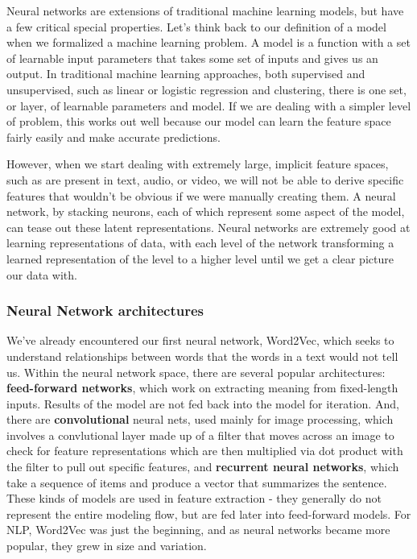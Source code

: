\documentclass[11pt, table]{diazessay} %
\begin{document}
\begin{sloppypar}
Neural networks are extensions of traditional machine learning models, but have a few critical special properties. Let's think back to our definition of a model when we formalized a machine learning problem. A model is a function with a set of learnable input parameters that takes some set of inputs and gives us an output. In traditional machine learning approaches, both supervised and unsupervised, such as linear or logistic regression and clustering, there is one set, or layer, of learnable parameters and model. If we are dealing with a simpler level of problem, this works out well because our model can learn the feature space fairly easily and make accurate predictions. 

However, when we start dealing with extremely large, implicit feature spaces, such as are present in text, audio, or video, we will not be able to derive specific features that wouldn't be obvious if we were manually creating them. A neural network, by stacking neurons, each of which represent some aspect of the model, can tease out these latent representations. Neural networks are extremely good at learning representations of data, with each level of the network transforming a learned representation of the level to a higher level until we get a clear picture our data with\citep{lecun2015deep}. 

\subsubsection{Neural Network architectures}

We've already encountered our first neural network, Word2Vec, which seeks to understand relationships between words that the words in a text would not tell us. Within the neural network space, there are several popular architectures: \textbf{feed-forward networks}, which work on extracting meaning from fixed-length inputs. Results of the model are not fed back into the model for iteration. And, there are   \textbf{convolutional} neural nets, used mainly for image processing, which involves a convlutional layer made up of a filter that moves across an image to check for feature representations which are then multiplied via dot product with the filter to pull out specific features, and \textbf{recurrent neural networks}, which take a sequence of items and produce a vector that summarizes the sentence. These kinds of models are used in feature extraction - they generally do not represent the entire modeling flow, but are fed later into feed-forward models. For NLP, Word2Vec was just the beginning, and as neural networks became more popular, they grew in size and variation.


\end{sloppypar}
\end{document}
